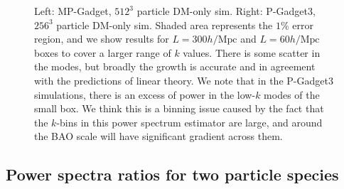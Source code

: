 \documentclass[]{article}
\begin{document}
\begin{figure}[h]
	\caption{Left: MP-Gadget, $512^3$ particle DM-only sim. Right: P-Gadget3, $256^3$ particle DM-only
sim. Shaded area represents the $1\%$ error region, and we show results for $L=300h/\mathrm{Mpc}$ and
$L=60h/\mathrm{Mpc}$ boxes to cover a larger range of $k$ values. There is some scatter in the modes, but broadly the growth is accurate and in agreement with the predictions of linear theory. We note that in the P-Gadget3 simulations, there is an excess of power in the low-$k$ modes of the small box. We think this is a binning issue caused by the fact that the $k$-bins in this power spectrum estimator are large, and around the BAO scale will have significant gradient across them.}
\end{figure}

\clearpage


\subsection{Power spectra ratios for two particle species}

\end{document}
